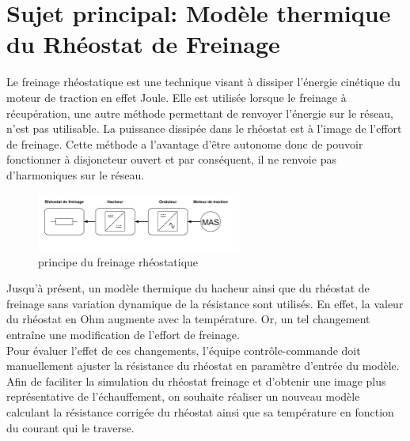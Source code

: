 \documentclass[a4paper]{report}
\begin{document}
	\section{Sujet principal: Modèle thermique du Rhéostat de Freinage}
	Le freinage rhéostatique est une technique visant à dissiper l'énergie cinétique du moteur de traction en effet Joule. Elle est utilisée lorsque le freinage à récupération, une autre méthode permettant de renvoyer l'énergie sur le réseau, n'est pas utilisable. La puissance dissipée dans le rhéostat est à l'image de l'effort de freinage. Cette méthode a l'avantage d'être autonome donc de pouvoir fonctionner à disjoncteur ouvert et par conséquent, il ne renvoie pas d'harmoniques sur le réseau.\\
	\begin{figure}[h]			
		\centering
		\includegraphics[width=0.60\textwidth]{rheostat_freinage}
		\caption{principe du freinage rhéostatique}
		\label{schema:rheo}
	\end{figure}
	Jusqu'à présent, un modèle thermique du hacheur ainsi que du rhéostat de freinage sans variation dynamique de la résistance sont utilisés. En effet, la valeur du rhéostat en Ohm augmente avec la température. Or, un tel changement entraîne une modification de l'effort de freinage.\\
	Pour évaluer l'effet de ces changements, l'équipe contrôle-commande doit manuellement ajuster la résistance du rhéostat en paramètre d'entrée du modèle. Afin de faciliter la simulation du rhéostat freinage et d'obtenir une image plus représentative de l'échauffement, on souhaite réaliser un nouveau modèle calculant la résistance corrigée du rhéostat ainsi que sa température en fonction du courant qui le traverse.

\pagebreak %
\end{document}
